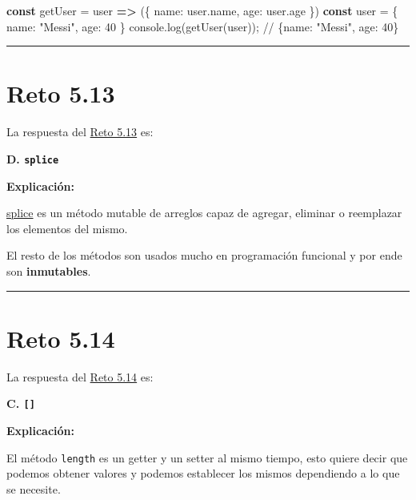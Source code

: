 \documentclass[
  letterpaper,
  DIV=11,
  numbers=noendperiod]{scrreprt}
\newenvironment{Shaded}{\begin{snugshade}}{\end{snugshade}}
\newcommand{\AttributeTok}[1]{\textcolor[rgb]{0.40,0.45,0.13}{#1}}
\newcommand{\BuiltInTok}[1]{\textcolor[rgb]{0.00,0.23,0.31}{#1}}
\newcommand{\CommentTok}[1]{\textcolor[rgb]{0.37,0.37,0.37}{#1}}
\newcommand{\DataTypeTok}[1]{\textcolor[rgb]{0.68,0.00,0.00}{#1}}
\newcommand{\DecValTok}[1]{\textcolor[rgb]{0.68,0.00,0.00}{#1}}
\newcommand{\FunctionTok}[1]{\textcolor[rgb]{0.28,0.35,0.67}{#1}}
\newcommand{\KeywordTok}[1]{\textcolor[rgb]{0.00,0.23,0.31}{\textbf{#1}}}
\newcommand{\NormalTok}[1]{\textcolor[rgb]{0.00,0.23,0.31}{#1}}
\newcommand{\OperatorTok}[1]{\textcolor[rgb]{0.37,0.37,0.37}{#1}}
\newcommand{\StringTok}[1]{\textcolor[rgb]{0.13,0.47,0.30}{#1}}
\begin{document}
\begin{Shaded}
\begin{Highlighting}[]
\KeywordTok{const}\NormalTok{ getUser }\OperatorTok{=}\NormalTok{ user }\KeywordTok{=\textgreater{}}\NormalTok{ (\{ }\DataTypeTok{name}\OperatorTok{:}\NormalTok{ user}\OperatorTok{.}\AttributeTok{name}\OperatorTok{,} \DataTypeTok{age}\OperatorTok{:}\NormalTok{ user}\OperatorTok{.}\AttributeTok{age}\NormalTok{ \})}
\KeywordTok{const}\NormalTok{ user }\OperatorTok{=}\NormalTok{ \{ }\DataTypeTok{name}\OperatorTok{:} \StringTok{"Messi"}\OperatorTok{,} \DataTypeTok{age}\OperatorTok{:} \DecValTok{40}\NormalTok{ \}}
\BuiltInTok{console}\OperatorTok{.}\FunctionTok{log}\NormalTok{(}\FunctionTok{getUser}\NormalTok{(user))}\OperatorTok{;} \CommentTok{// \{name: "Messi", age: 40\}}
\end{Highlighting}
\end{Shaded}

\begin{center}\rule{0.5\linewidth}{0.5pt}\end{center}

\section{Reto 5.13}\label{sec-sol-cap5-reto13}

La respuesta del \hyperref[sec-cap5-reto13]{Reto 5.13} es:

\textbf{D. \texttt{splice}}

\textbf{Explicación:}

\hyperref[glos-splice]{splice} es un método mutable de arreglos capaz de
agregar, eliminar o reemplazar los elementos del mismo.

El resto de los métodos son usados mucho en programación funcional y por
ende son \textbf{inmutables}.

\begin{center}\rule{0.5\linewidth}{0.5pt}\end{center}

\section{Reto 5.14}\label{sec-sol-cap5-reto14}

La respuesta del \hyperref[sec-cap5-reto14]{Reto 5.14} es:

\textbf{C. \texttt{{[}{]}}}

\textbf{Explicación:}

El método \texttt{length} es un getter y un setter al mismo tiempo, esto
quiere decir que podemos obtener valores y podemos establecer los mismos
dependiendo a lo que se necesite.
\end{document}
